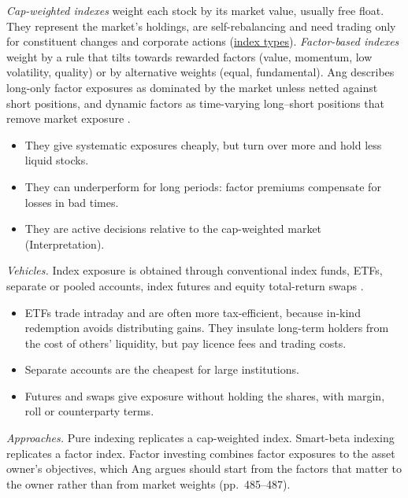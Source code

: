 \begin{qfdefinition}\label{def:cap-weighted-factor-indexing}
 \emph{Cap-weighted indexes} weight each stock by its market value, usually free float. They represent the market's holdings, are self-rebalancing and need trading only for constituent changes and corporate actions (\hyperref[def:equity-fixed-income-index-types]{index types}). \emph{Factor-based indexes} weight by a rule that tilts towards rewarded factors (value, momentum, low volatility, quality) or by alternative weights (equal, fundamental). Ang describes long-only factor exposures as dominated by the market unless netted against short positions, and dynamic factors as time-varying long--short positions that remove market exposure \citep[chap.~14, pp.~449--451]{s7-ang}.
\begin{itemize}
\item They give systematic exposures cheaply, but turn over more and hold less liquid stocks.
\item They can underperform for long periods: factor premiums compensate for losses in bad times.
\item They are active decisions relative to the cap-weighted market (Interpretation).
\end{itemize}

\emph{Vehicles.} Index exposure is obtained through conventional index funds, ETFs, separate or pooled accounts, index futures and equity total-return swaps \citep[chap.~7, secs.~4.2.1--4.2.3, pp.~422--429]{managing-investment-portfolios-2007}.
\begin{itemize}
\item ETFs trade intraday and are often more tax-efficient, because in-kind redemption avoids distributing gains. They insulate long-term holders from the cost of others' liquidity, but pay licence fees and trading costs.
\item Separate accounts are the cheapest for large institutions.
\item Futures and swaps give exposure without holding the shares, with margin, roll or counterparty terms.
\end{itemize}

\emph{Approaches.} Pure indexing replicates a cap-weighted index. Smart-beta indexing replicates a factor index. Factor investing combines factor exposures to the asset owner's objectives, which Ang argues should start from the factors that matter to the owner rather than from market weights (pp.~485--487).


\end{qfdefinition}
